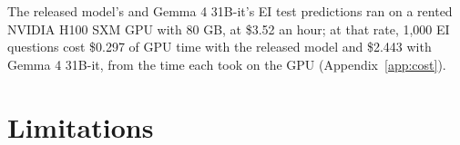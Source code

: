 \documentclass[11pt,letterpaper]{article}
\begin{document}
\begin{table}[t]
\centering\scriptsize
\caption{Deferral (pre-registered, secondary): the combined accuracy of the released model and Gemma 4 31B-it, given the same input, when a share of the 1,218 test prompts is deferred to Gemma 4 31B-it, with 95 percent intervals from 1,000 article resamples. Max probability defers first the answers whose top probability is lowest. The learned rule was fitted and frozen on validation. Random gives the expected value of random deferral. Gemma 4 31B-it's confidence defers first the items on which its own top probability is highest, which needs its answer on every item. The oracle defers the items the released model gets wrong and Gemma 4 31B-it gets right, which bounds any rule. The released model alone: 0.9269; Gemma 4 31B-it alone: 0.8752.}
\label{tab:handoff}

\end{table}

The released model's and Gemma 4 31B-it's EI test predictions ran on a rented NVIDIA H100 SXM GPU with 80 GB, at \$3.52 an hour; at that rate, 1,000 EI questions cost \$0.297 of GPU time with the released model and \$2.443 with Gemma 4 31B-it, from the time each took on the GPU (Appendix~\ref{app:cost}).

\section{Limitations}
\label{sec:limits}
\end{document}
